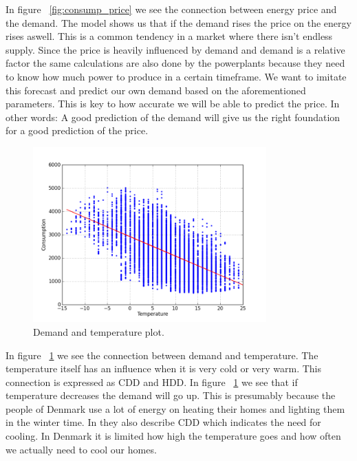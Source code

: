 In figure ~\ref{fig:consump_price} we see the connection between energy price and the demand. The model shows us that if the demand rises the price on the energy rises aswell. This is a common tendency in a market where there isn't endless supply. Since the price is heavily influenced by demand and demand is a relative factor the same calculations are also done by the powerplants because they need to know how much power to produce in a certain timeframe. We want to imitate this forecast and predict our own demand based on the aforementioned parameters. This is key to how accurate we will be able to predict the price. In other words: A good prediction of the demand will give us the right foundation for a good prediction of the price.

\begin{figure}[H]
\centering
\includegraphics[width=0.8\textwidth ,natwidth=410,natheight=237]{billeder/energy_price_plots/consump_temp.png}
\caption{Demand and temperature plot.}
\label{fig:consump_temp}
\end{figure}


In figure ~\ref{fig:consump_temp} we see the connection between demand and temperature. The temperature itself has an influence when it is very cold or very warm. This connection is expressed as CDD and HDD. In figure ~\ref{fig:consump_temp} we see that if temperature decreases the demand will go up. This is presumably because the people of Denmark use a lot of energy on heating their homes and lighting them in the winter time. In \cite{19} they also describe CDD which indicates the need for cooling. In Denmark it is limited how high the temperature goes and how often we actually need to cool our homes.


